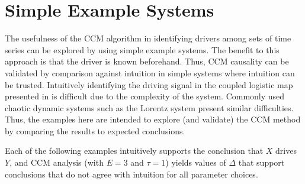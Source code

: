 \documentclass[twocolumn,aps,pre,groupedaddress]{revtex4-1}
\begin{document}
\section{Simple Example Systems}
The usefulness of the CCM algorithm in identifying drivers among sets of time series can be explored by using simple example systems.  The benefit to this approach is that the driver is known beforehand.  Thus, CCM causality can be validated by comparison against intuition in simple systems where intuition can be trusted.  Intuitively identifying the driving signal in the coupled logistic map presented in \cite{Sugihara2012} is difficult due to the complexity of the system.  Commonly used chaotic dynamic systems such as the Lorentz system present similar difficulties.  Thus, the examples here are intended to explore (and validate) the CCM method by comparing the results to expected conclusions.

Each of the following examples intuitively supports the conclusion that $X$ drives $Y$, and CCM analysis (with $E=3$ and $\tau=1$) yields values of $\Delta$ that support conclusions that do not agree with intuition for all parameter choices.
\end{document}
